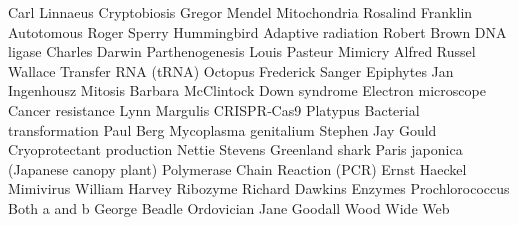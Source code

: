 \answerkey
{} Carl Linnaeus
 Cryptobiosis
 Gregor Mendel
 Mitochondria
 Rosalind Franklin
 Autotomous
 Roger Sperry
 Hummingbird
 Adaptive radiation
 Robert Brown
 DNA ligase
 Charles Darwin
 Parthenogenesis
 Louis Pasteur
 Mimicry
 Alfred Russel Wallace
 Transfer RNA (tRNA)
 Octopus
 Frederick Sanger
 Epiphytes
 Jan Ingenhousz
 Mitosis
 Barbara McClintock
 Down syndrome
 Electron microscope
 Cancer resistance
 Lynn Margulis
 CRISPR‑Cas9
 Platypus
 Bacterial transformation
 Paul Berg
 Mycoplasma genitalium
 Stephen Jay Gould
 Cryoprotectant production
 Nettie Stevens
 Greenland shark
 Paris japonica (Japanese canopy plant)
 Polymerase Chain Reaction (PCR)
 Ernst Haeckel
 Mimivirus
 William Harvey
 Ribozyme
 Richard Dawkins
 Enzymes
 Prochlorococcus
 Both a and b
 George Beadle
 Ordovician
 Jane Goodall
 Wood Wide Web
\endanswerkey